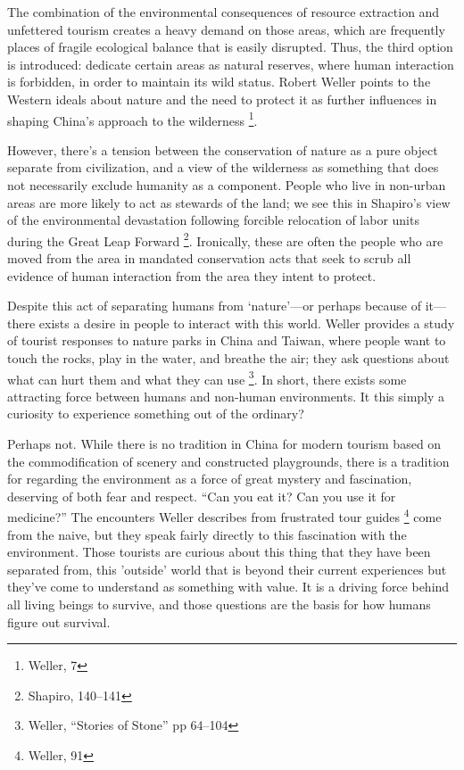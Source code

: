 The combination of the environmental consequences of resource extraction and
unfettered tourism creates a heavy demand on those areas, which are frequently
places of fragile ecological balance that is easily disrupted. Thus, the third
option is introduced: dedicate certain areas as natural reserves, where human
interaction is forbidden, in order to maintain its wild status. Robert Weller
points to the Western ideals about nature and the need to protect it as further
influences in shaping China's approach to the wilderness \footnote{Weller, 7}.

However, there's a tension between the conservation of nature as a pure object
separate from civilization, and a view of the wilderness as something that does
not necessarily exclude humanity as a component. People who live in non-urban
areas are more likely to act as stewards of the land; we see this in Shapiro's
view of the environmental devastation following forcible relocation of labor
units during the Great Leap Forward \footnote{Shapiro, 140--141}.  Ironically,
these are often the people who are moved from the area in mandated conservation
acts that seek to scrub all evidence of human interaction from the area they
intent to protect.

Despite this act of separating humans from `nature'---or perhaps because of
it---there exists a desire in people to interact with this world. Weller
provides a study of tourist responses to nature parks in China and Taiwan, where
people want to touch the rocks, play in the water, and breathe the air; they ask
questions about what can hurt them and what they can use \footnote{Weller,
``Stories of Stone'' pp 64--104}. In short, there exists some attracting force
between humans and non-human environments. It this simply a curiosity to
experience something out of the ordinary?

Perhaps not. While there is no tradition in China for modern tourism based on
the commodification of scenery and constructed playgrounds, there is a tradition
for regarding the environment as a force of great mystery and fascination,
deserving of both fear and respect. ``Can you eat it? Can you use it for
medicine?'' The encounters Weller describes from frustrated tour guides
\footnote{Weller, 91} come from the naive, but they speak fairly directly to
this fascination with the environment. Those tourists are curious about this
thing that they have been separated from, this 'outside' world that is beyond
their current experiences but they've come to understand as something with
value. It is a driving force behind all living beings to survive, and those
questions are the basis for how humans figure out survival.

